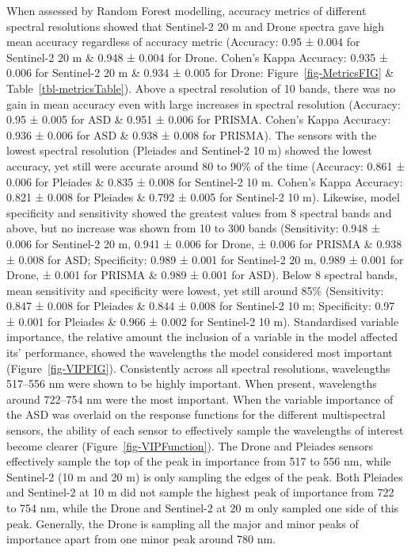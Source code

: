 \documentclass[
  letterpaper,
  11pt,
  english,
  singlespacing,
  headsepline]{MastersDoctoralThesis}
\begin{document}
\begin{spacing}{1.5}
When assessed by Random Forest modelling, accuracy metrics of different
spectral resolutions showed that Sentinel-2 20 m and Drone spectra gave
high mean accuracy regardless of accuracy metric (Accuracy: 0.95 ± 0.004
for Sentinel-2 20 m \& 0.948 ± 0.004 for Drone. Cohen's Kappa Accuracy:
0.935 ± 0.006 for Sentinel-2 20 m \& 0.934 ± 0.005 for Drone:
Figure~\ref{fig-MetricsFIG} \& Table~\ref{tbl-metricsTable}). Above a
spectral resolution of 10 bands, there was no gain in mean accuracy even
with large increases in spectral resolution (Accuracy: 0.95 ± 0.005 for
ASD \& 0.951 ± 0.006 for PRISMA. Cohen's Kappa Accuracy: 0.936 ± 0.006
for ASD \& 0.938 ± 0.008 for PRISMA). The sensors with the lowest
spectral resolution (Pleiades and Sentinel-2 10 m) showed the lowest
accuracy, yet still were accurate around 80 to 90\% of the time
(Accuracy: 0.861 ± 0.006 for Pleiades \& 0.835 ± 0.008 for Sentinel-2 10
m. Cohen's Kappa Accuracy: 0.821 ± 0.008 for Pleiades \& 0.792 ± 0.005
for Sentinel-2 10 m). Likewise, model specificity and sensitivity showed
the greatest values from 8 spectral bands and above, but no increase was
shown from 10 to 300 bands (Sensitivity: 0.948 ± 0.006 for Sentinel-2 20
m, 0.941 ± 0.006 for Drone, ± 0.006 for PRISMA \& 0.938 ± 0.008 for ASD;
Specificity: 0.989 ± 0.001 for Sentinel-2 20 m, 0.989 ± 0.001 for Drone,
± 0.001 for PRISMA \& 0.989 ± 0.001 for ASD). Below 8 spectral bands,
mean sensitivity and specificity were lowest, yet still around 85\%
(Sensitivity: 0.847 ± 0.008 for Pleiades \& 0.844 ± 0.008 for Sentinel-2
10 m; Specificity: 0.97 ± 0.001 for Pleiades \& 0.966 ± 0.002 for
Sentinel-2 10 m). Standardised variable importance, the relative amount
the inclusion of a variable in the model affected its' performance,
showed the wavelengths the model considered most important
(Figure~\ref{fig-VIPFIG}). Consistently across all spectral resolutions,
wavelengths 517--556 nm were shown to be highly important. When present,
wavelengths around 722--754 nm were the most important. When the
variable importance of the ASD was overlaid on the response functions
for the different multispectral sensors, the ability of each sensor to
effectively sample the wavelengths of interest become clearer
(Figure~\ref{fig-VIPFunction}). The Drone and Pleiades sensors
effectively sample the top of the peak in importance from 517 to 556 nm,
while Sentinel-2 (10 m and 20 m) is only sampling the edges of the peak.
Both Pleiades and Sentinel-2 at 10 m did not sample the highest peak of
importance from 722 to 754 nm, while the Drone and Sentinel-2 at 20 m
only sampled one side of this peak. Generally, the Drone is sampling all
the major and minor peaks of importance apart from one minor peak around
780 nm.


\end{spacing}
\end{document}
